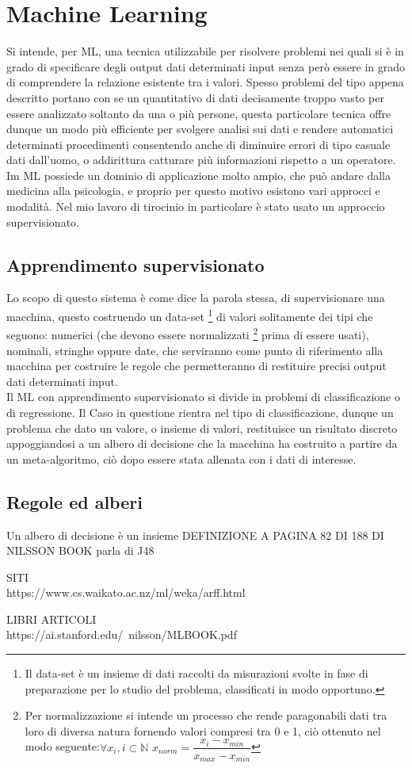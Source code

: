 \chapter{Machine Learning}
Si intende, per ML, una tecnica utilizzabile per risolvere problemi  nei quali si è in grado di specificare degli output dati determinati input senza però essere in grado di comprendere la relazione esistente tra i valori. Spesso problemi del tipo appena descritto portano con se un quantitativo di dati decisamente troppo vasto per essere analizzato soltanto da una o più persone, questa particolare tecnica offre dunque un modo più efficiente per svolgere analisi sui dati e rendere automatici determinati procedimenti consentendo anche di diminuire errori di tipo casuale dati dall'uomo, o addirittura catturare più informazioni rispetto a un operatore.\\
Im ML possiede un dominio di applicazione molto ampio, che può andare dalla medicina alla psicologia, e proprio per questo motivo esistono vari approcci e modalità. Nel mio lavoro di tirocinio in particolare è stato usato un approccio supervisionato. 
\section{Apprendimento supervisionato}
Lo scopo di questo sistema è come dice la parola stessa, di supervisionare una macchina, questo costruendo un data-set \footnote{Il data-set è un insieme di dati raccolti da misurazioni svolte in fase di preparazione per lo studio del problema, classificati in modo opportuno.}
di valori solitamente dei tipi che seguono: numerici (che devono essere normalizzati \footnote{Per normalizzazione si intende un processo che rende paragonabili dati tra loro di diversa natura fornendo valori compresi tra 0 e 1, ciò ottenuto nel modo seguente:\newline $\forall x_{i}, i\subset\mathbb{N}$ $x_{norm} = \dfrac{x_{i}-x_{min}}{x_{max} - x_{min}} $} prima di essere usati), nominali, stringhe oppure date, che serviranno come punto di riferimento alla macchina per costruire le regole che permetteranno di restituire precisi output dati determinati input.\\
Il ML con apprendimento supervisionato si divide in problemi di classificazione o di regressione. Il Caso in questione rientra nel tipo di classificazione, dunque un problema che dato un valore, o insieme di valori, restituisce un risultato discreto appoggiandosi a un albero di decisione che la macchina ha costruito a partire da un meta-algoritmo, ciò dopo essere stata allenata con i dati di interesse.
\section{Regole ed alberi} 
Un albero di decisione è un insieme DEFINIZIONE A PAGINA 82 DI 188 DI NILSSON BOOK
parla di J48

SITI\\
https://www.cs.waikato.ac.nz/ml/weka/arff.html

LIBRI ARTICOLI\\
https://ai.stanford.edu/~nilsson/MLBOOK.pdf

